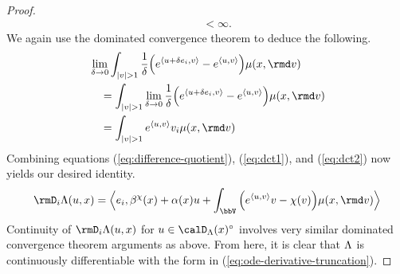 \begin{proof}
\begin{align*}
    &\quad < \infty.
  \end{align*}
  We again use the dominated convergence theorem to deduce the following.
  \begin{align}
    &\lim_{\delta \rightarrow 0} \int_{|\markVar|> 1} \frac1\delta \Big( e^\prj{\momentVar+\delta \basisVec_i}{\markVar} - e^\prj{\momentVar}{\markVar} \Big) \affJump(\stateVar,\rmd\markVar) \notag \\
    &\quad= \int_{|\markVar|> 1} \lim_{\delta\rightarrow0} \frac{1}{\delta} \Big( e^\prj{\momentVar+\delta \basisVec_i}{\markVar} - e^\prj{\momentVar}{\markVar}  \Big) \affJump(\stateVar,\rmd\markVar) \notag \\
    \label{eq:dct2}
    &\quad= \int_{|\markVar|>1} e^\prj{\momentVar}{\markVar} \markVar_i  \affJump(\stateVar,\rmd\markVar)
  \end{align}
  Combining equations (\ref{eq:difference-quotient}), (\ref{eq:dct1}), and (\ref{eq:dct2}) now yields our desired identity.
  \begin{equation*}
    \Der_i \ode(\momentVar,\stateVar)
    = \Bprj{\basisVec_i}{\affDrift^\trunc(\stateVar) + \affDiff(\stateVar)\momentVar + \int_\vecSpace \Big( e^\prj{\momentVar}{\markVar} \markVar - \trunc(\markVar) \Big) \affJump(\stateVar,\rmd\markVar)}
  \end{equation*}
  Continuity of $\Der_i \ode(\momentVar, \stateVar)$ for $\momentVar \in \odeSpace(\stateVar)^\circ$ involves very similar dominated convergence theorem arguments as above.
  From here, it is clear that $\Lambda$ is continuously differentiable with the form in (\ref{eq:ode-derivative-truncation}).
\end{proof}
